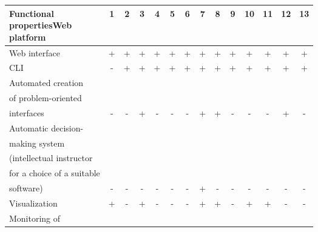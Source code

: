 \documentclass[procedia]{easychair}
\begin{document}
\begin{table}[htp]
	\begin{centering}
		\begin{tabular}{|l|c|c|c|c|c|c|c|c|c|c|c|c|c|}
		\hline
		\diagbox{\textbf{\small{Functional}}\\\textbf{\small{properties}}}{\textbf{\small{Web}}\\\textbf{\small{platform}}}                                                                        & 1 & 2 & 3 & 4 & 5 & 6 & 7 & 8 & 9 & 10& 11& 12& 13 \\
		\hline
	\small{Web interface}                                              & + & + & + & + & + & + & + & + & + & + & + & + & + \\
		\hline
         \small{CLI}                                                  & - & + & + & + & + & + & + & + & + & + & + & + & + \\
 	\hline
   \small{Automated creation}                                       &   &   &   &   &   &   &   &   &   &   &   &   &  \\
   \small{of problem-oriented}                                    &   &   &   &   &   &   &   &   &   &   &   &   &  \\
   \small{interfaces}                                              & - & - & + & - & - & - & + & + & - & - & - & + & - \\         
     	 \hline
   	 \small{Automatic decision-}                                 &   &   &   &   &   &   &   &   &   &   &   &   &  \\
   	 \small{making system}                                           &   &   &   &   &   &   &   &   &   &   &   &   &  \\
   	 \small{(intellectual instructor}                                      &   &   &   &   &   &   &   &   &   &   &   &   &  \\
   	 \small{for a choice of a suitable}                                   &   &   &   &   &   &   &   &   &   &   &   &   &  \\
   	 \small{ software)}                                   & - & - & - & - & - & - & + & - & - & - & - & - & - \\    
     		\hline
   	\small{Visualization}	                                           & + & - & + & - & - & - & + & + & - & + & + & - & - \\
   		\hline
   	 \small{Monitoring of}                                            &   &   &   &   &   &   &   &   &   &   &   &   &  \\

\end{tabular}
\end{centering}
\end{table}
\end{document}
